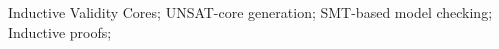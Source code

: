 \documentclass[10pt, conference]{IEEEtran}
\begin{document}
\begin{IEEEkeywords}
Inductive Validity Cores; UNSAT-core generation; SMT-based model checking; Inductive proofs;
\end{IEEEkeywords}

\IEEEpeerreviewmaketitle


%










%



%
%

%


\vspace{0.08in}






%
%


\end{document}
